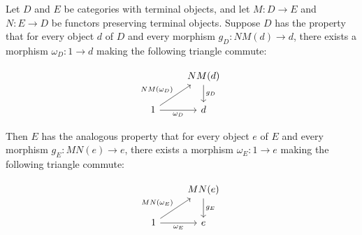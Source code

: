 \begin{theorem}
Let $D$ and $E$ be categories with terminal objects, and let $M : D \to E$ and $N : E \to D$ be functors preserving terminal objects. Suppose $D$ has the property that for every object $d$ of $D$ and every morphism $g_D: NM(d) \to d$, there exists a morphism $\omega_D : 1 \to d$ making the following triangle commute:

\[\begin{tikzcd}
	& {NM(d)} \\
	1 & d
	\arrow["{NM(\omega_D)}", from=2-1, to=1-2]
	\arrow["{g_D}", from=1-2, to=2-2]
	\arrow["{\omega_D}"', from=2-1, to=2-2]
\end{tikzcd}\]

Then $E$ has the analogous property that for every object $e$ of $E$ and every morphism $g_E: MN(e) \to e$, there exists a morphism $\omega_E: 1 \to e$ making the following triangle commute:

\[\begin{tikzcd}
	& {MN(e)} \\
	1 & e
	\arrow["{MN(\omega_E)}", from=2-1, to=1-2]
	\arrow["{g_E}", from=1-2, to=2-2]
	\arrow["{\omega_E}"', from=2-1, to=2-2]
\end{tikzcd}\]
\end{theorem}
